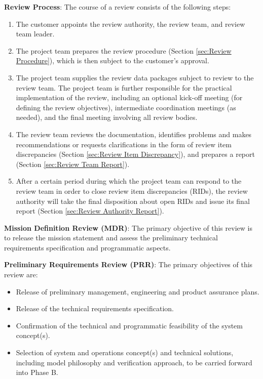 \textbf{Review Process}: The course of a review consists of the following steps:
\begin{enumerate}
\item The customer appoints the review authority, the review team, and review team leader.
\item The project team prepares the review procedure (Section \ref{sec:Review Procedure}), which is then subject to the customer's approval.
\item The project team supplies the review data packages subject to review to the review team. The project team is further responsible for the practical implementation of the review, including an optional kick-off meeting (for defining the review objectives), intermediate coordination meetings (as needed), and the final meeting involving all review bodies.
\item The review team reviews the documentation, identifies problems and makes recommendations or requests clarifications in the form of review item discrepancies (Section \ref{sec:Review Item Discrepancy}), and prepares a report (Section \ref{sec:Review Team Report}). 
\item After a certain period during which the project team can respond to the review team in order to close review item discrepancies (RIDs), the review authority will take the final disposition about open RIDs and issue its final report (Section \ref{sec:Review Authority Report}).
\end{enumerate}

\textbf{Mission Definition Review (MDR)}: The primary objective of this review is to release the mission statement and assess the preliminary technical requirements specification and programmatic aspects.

\textbf{Preliminary Requirements Review (PRR)}: The primary objectives of this review are:
\begin{itemize}
\item Release of preliminary management, engineering and product assurance plans.
\item Release of the technical requirements specification.
\item Confirmation of the technical and programmatic feasibility of the system concept(s).
\item Selection of system and operations concept(s) and technical solutions, including model philosophy and verification approach, to be carried forward into Phase B.
\end{itemize}

